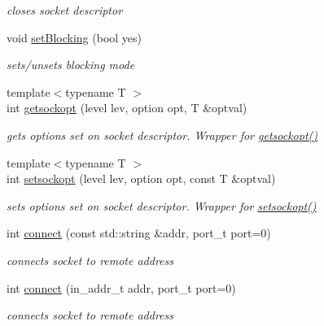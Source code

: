 \begin{CompactItemize}
\begin{CompactList}\small\item\em closes socket descriptor \item\end{CompactList}\item 
void \hyperlink{classsocketpp_1_1BaseSocket_4cffcd5cae4ef51e953495837fade4c3}{setBlocking} (bool yes)
\begin{CompactList}\small\item\em sets/unsets blocking mode \item\end{CompactList}\item 
{\footnotesize template$<$typename T $>$ }\\int \hyperlink{classsocketpp_1_1BaseSocket_c845c3a037f0f400fd50dfb58706b6e4}{getsockopt} (level lev, option opt, T \&optval)
\begin{CompactList}\small\item\em gets options set on socket descriptor. Wrapper for \hyperlink{classsocketpp_1_1BaseSocket_c845c3a037f0f400fd50dfb58706b6e4}{getsockopt()} \item\end{CompactList}\item 
{\footnotesize template$<$typename T $>$ }\\int \hyperlink{classsocketpp_1_1BaseSocket_3f1f168e4953c046bb1159941da2fa30}{setsockopt} (level lev, option opt, const T \&optval)
\begin{CompactList}\small\item\em sets options set on socket descriptor. Wrapper for \hyperlink{classsocketpp_1_1BaseSocket_3f1f168e4953c046bb1159941da2fa30}{setsockopt()} \item\end{CompactList}\item 
int \hyperlink{classsocketpp_1_1BaseSocket_769710192256606aaec1a776468d75fa}{connect} (const std::string \&addr, port\_\-t port=0)
\begin{CompactList}\small\item\em connects socket to remote address \item\end{CompactList}\item 
int \hyperlink{classsocketpp_1_1BaseSocket_2bdd6d459e6f9cf2f71636b01787b250}{connect} (in\_\-addr\_\-t addr, port\_\-t port=0)
\begin{CompactList}\small\item\em connects socket to remote address \item\end{CompactList}\item 

\end{CompactItemize}
